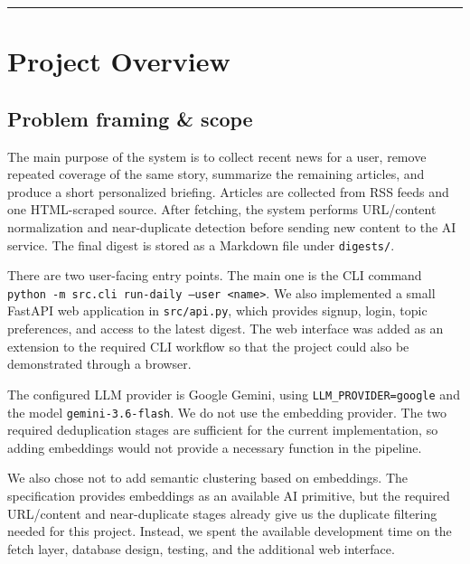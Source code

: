 \documentclass[11pt,a4paper]{article}
\begin{document}
\tableofcontents

\vspace{0.6em}
\hrule
\vspace{0.4em}

\section{Project Overview}

\subsection{Problem framing \& scope}


The main purpose of the system is to collect recent news for a user, remove repeated coverage of the same story, summarize the remaining articles, and produce a short personalized briefing. Articles are collected from RSS feeds and one HTML-scraped source. After fetching, the system performs URL/content normalization and near-duplicate detection before sending new content to the AI service. The final digest is stored as a Markdown file under \texttt{digests/}.

There are two user-facing entry points. The main one is the CLI command \texttt{python -m src.cli run-daily --user <name>}. We also implemented a small FastAPI web application in \texttt{src/api.py}, which provides signup, login, topic preferences, and access to the latest digest. The web interface was added as an extension to the required CLI workflow so that the project could also be demonstrated through a browser.

The configured LLM provider is Google Gemini, using \texttt{LLM\_PROVIDER=google} and the model \texttt{gemini-3.6-flash}. We do not use the embedding provider. The two required deduplication stages are sufficient for the current implementation, so adding embeddings would not provide a necessary function in the pipeline.

We also chose not to add semantic clustering based on embeddings. The specification provides embeddings as an available AI primitive, but the required URL/content and near-duplicate stages already give us the duplicate filtering needed for this project. Instead, we spent the available development time on the fetch layer, database design, testing, and the additional web interface.

\end{document}
